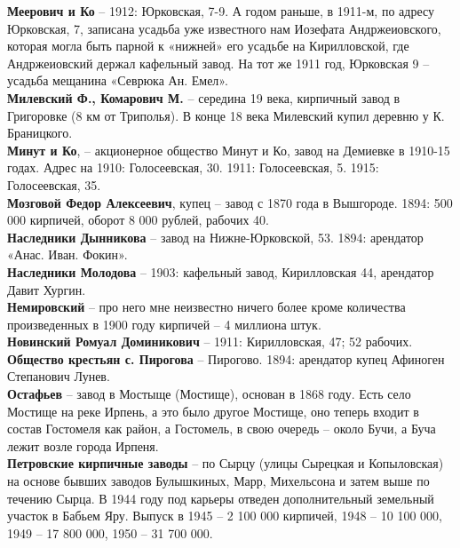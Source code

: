 \noindent\textbf{Меерович и Ко} – 1912: Юрковская, 7-9. А годом раньше, в 1911-м, по адресу Юрковская, 7, записана усадьба уже известного нам Иозефата Андржеиовского, которая могла быть парной к «нижней» его усадьбе на Кирилловской, где Андржеиовский держал кафельный завод. На тот же 1911 год, Юрковская 9 – усадьба мещанина «Севрюка Ан. Емел».\\

\noindent\textbf{Милевский Ф., Комарович М.} – середина 19 века, кирпичный завод в Григоровке (8 км от Триполья). В конце 18 века Милевский купил деревню у К. Браницкого.\\

\noindent\textbf{Минут и Ко}, – акционерное общество Минут и Ко, завод на Демиевке в 1910-15 годах. Адрес на 1910: Голосеевская, 30. 1911: Голосеевская, 5. 1915: Голосеевская, 35.\\

\noindent\textbf{Мозговой Федор Алексеевич}, купец – завод с 1870 года в Вышгороде. 1894: 500 000 кирпичей, оборот 8 000 рублей, рабочих 40.\\

\noindent\textbf{Наследники Дынникова} – завод на Нижне-Юрковской, 53. 1894: арендатор «Анас. Иван. Фокин».\\

\noindent\textbf{Наследники Молодова} – 1903: кафельный завод, Кирилловская 44, арендатор Давит Хургин.\\

\noindent\textbf{Немировский} – про него мне неизвестно ничего более кроме количества произведенных в 1900 году кирпичей – 4 миллиона штук.\\

\noindent\textbf{Новинский Ромуал Доминикович} – 1911: Кирилловская, 47; 52 рабочих.\\

\noindent\textbf{Общество крестьян с. Пирогова} – Пирогово. 1894: арендатор купец Афиноген Степанович Лунев.\\

\noindent\textbf{Остафьев} – завод в Мостыще (Мостище), основан в 1868 году. Есть село Мостище на реке Ирпень, а это было другое Мостище, оно теперь входит в состав Гостомеля как район, а Гостомель, в свою очередь – около Бучи, а Буча лежит возле города Ирпеня.\\

\noindent\textbf{Петровские кирпичные заводы} – по Сырцу (улицы Сырецкая и Копыловская) на основе бывших заводов Булышкиных, Марр, Михельсона и затем выше по течению Сырца. В 1944 году под карьеры отведен дополнительный земельный участок в Бабьем Яру. Выпуск в 1945 – 2 100 000 кирпичей, 1948 – 10 100 000, 1949 – 17 800 000, 1950 – 31 700 000. 

